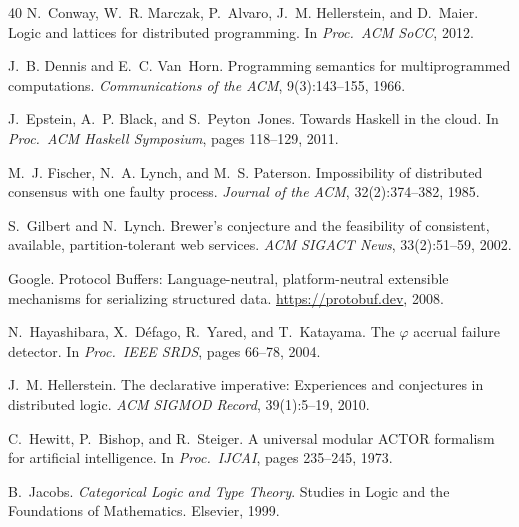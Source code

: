 \documentclass[11pt,a4paper]{article}
\begin{document}
\begin{thebibliography}{40}
N.~Conway, W.~R. Marczak, P.~Alvaro, J.~M. Hellerstein, and D.~Maier.
\newblock Logic and lattices for distributed programming.
\newblock In \emph{Proc.\ ACM SoCC}, 2012.

J.~B. Dennis and E.~C. Van~Horn.
\newblock Programming semantics for multiprogrammed computations.
\newblock \emph{Communications of the ACM}, 9(3):143--155, 1966.

J.~Epstein, A.~P. Black, and S.~Peyton~Jones.
\newblock Towards {Haskell} in the cloud.
\newblock In \emph{Proc.\ ACM Haskell Symposium}, pages 118--129, 2011.

M.~J. Fischer, N.~A. Lynch, and M.~S. Paterson.
\newblock Impossibility of distributed consensus with one faulty process.
\newblock \emph{Journal of the ACM}, 32(2):374--382, 1985.

S.~Gilbert and N.~Lynch.
\newblock Brewer's conjecture and the feasibility of consistent, available,
  partition-tolerant web services.
\newblock \emph{ACM SIGACT News}, 33(2):51--59, 2002.

Google.
\newblock Protocol {Buffers}: Language-neutral, platform-neutral extensible
  mechanisms for serializing structured data.
\newblock \url{https://protobuf.dev}, 2008.

N.~Hayashibara, X.~D{\'e}fago, R.~Yared, and T.~Katayama.
\newblock The $\varphi$ accrual failure detector.
\newblock In \emph{Proc.\ IEEE SRDS}, pages 66--78, 2004.

J.~M. Hellerstein.
\newblock The declarative imperative: Experiences and conjectures in
  distributed logic.
\newblock \emph{ACM SIGMOD Record}, 39(1):5--19, 2010.

C.~Hewitt, P.~Bishop, and R.~Steiger.
\newblock A universal modular {ACTOR} formalism for artificial intelligence.
\newblock In \emph{Proc.\ IJCAI}, pages 235--245, 1973.

B.~Jacobs.
\newblock \emph{Categorical Logic and Type Theory}.
\newblock Studies in Logic and the Foundations of Mathematics.
  Elsevier, 1999.


\end{thebibliography}
\end{document}
